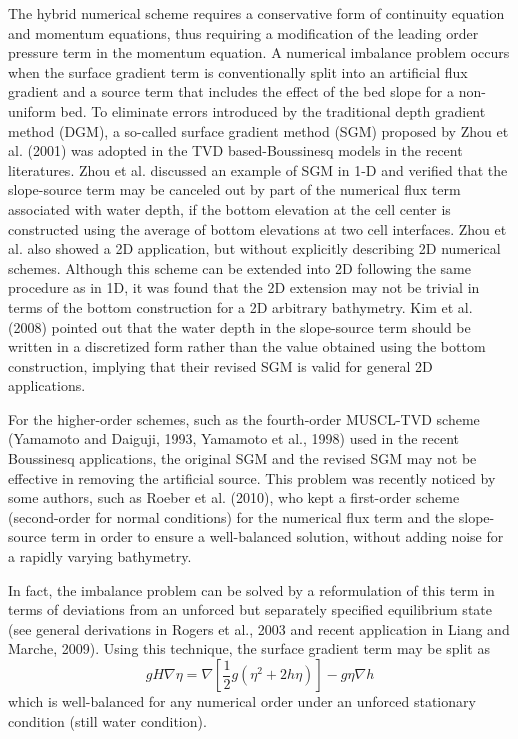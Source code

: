 \documentclass[11pt]{article}
\newcommand{\be}{\begin{equation}}
\newcommand{\ee}{\end{equation}}
\begin{document}
The hybrid numerical  scheme  requires a conservative form of continuity equation and momentum equations,   thus requiring a modification of the leading order pressure term in the momentum equation.  A numerical imbalance problem occurs  when the surface gradient term is conventionally split into an artificial flux gradient and a source term that includes the effect of the bed slope for a non-uniform bed.   To eliminate errors introduced by the  traditional depth gradient method (DGM), a so-called surface gradient method (SGM) proposed by Zhou et al. (2001) was adopted in the TVD based-Boussinesq models in the recent literatures. Zhou et al. discussed an example of SGM in 1-D and verified that the slope-source term may be canceled out by part of the numerical flux term associated with water depth, if the bottom elevation at the cell center is constructed using the average of bottom elevations at two cell interfaces. Zhou et al. also showed a 2D application, but without explicitly describing 2D numerical schemes. Although this scheme can be extended into 2D following the same procedure as in 1D, it was found that the 2D extension may not be trivial in terms of the bottom construction for a 2D arbitrary bathymetry. Kim et al. (2008) pointed out that the water depth in the slope-source term should be written in a discretized form rather than the value obtained using the bottom construction, implying that their revised SGM is valid for general 2D applications.

For the higher-order schemes, such as the fourth-order MUSCL-TVD scheme (Yamamoto and Daiguji, 1993, Yamamoto et al., 1998) used in the recent Boussinesq applications, the original SGM and the revised SGM may not be effective in removing the artificial source. This problem was recently noticed by some authors, such as Roeber et al. (2010),  who kept a first-order scheme (second-order for normal conditions) for the numerical flux term and the slope-source term in order to ensure a well-balanced solution,  without adding noise for a rapidly varying bathymetry.

In fact, the imbalance problem can be solved by a reformulation of this term in terms of deviations  from an unforced but separately specified equilibrium state (see general derivations in Rogers et al., 2003 and recent application in Liang and Marche, 2009). Using this technique, the surface gradient term may be split as  
\be
g H \nabla \eta = \nabla \left[ \frac{1}{2} g (\eta^2 + 2 h \eta )\right] - g \eta \nabla h  \label{eq15}
\ee
which is well-balanced for any numerical order  under an unforced stationary condition (still water condition).
\end{document}
